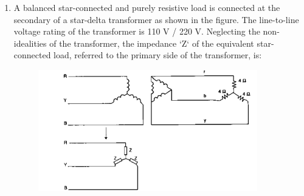 \documentclass[12pt]{article}
\theoremstyle{remark}
\begin{document}
\begin{enumerate}
\item A balanced star-connected and purely resistive load is connected at the secondary of a star-delta transformer as shown in the figure. The line-to-line voltage rating of the transformer is 110 V / 220 V. Neglecting the non-idealities of the transformer, the impedance `Z` of the equivalent star-connected load, referred to the primary side of the transformer, is:
\begin{figure}[H]
    \centering
    \includegraphics[width=0.9\textwidth]{Figs/Q41.png}
    \caption{}
    \label{fig:1.31}
\end{figure}
\begin{enumerate}
\end{enumerate}
\hfill{}


\end{enumerate}
\end{document}
